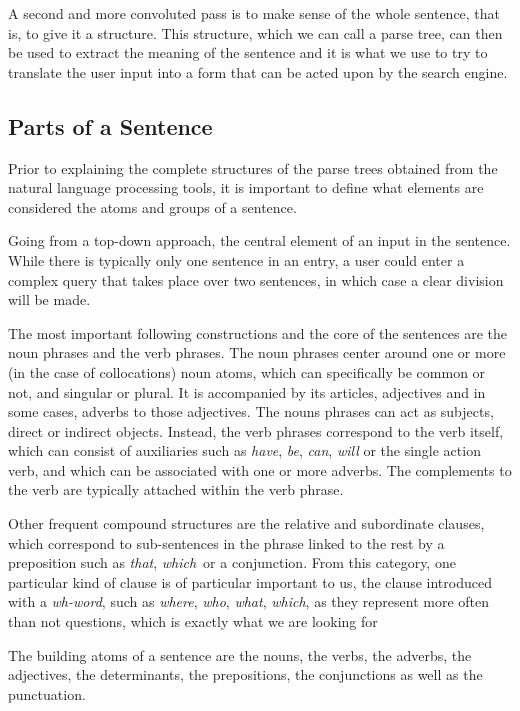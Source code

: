A second and more convoluted pass is to make sense of the whole sentence, that is, to give it a structure. This structure, which we can call a parse tree, can then be used to extract the meaning of the sentence and it is what we use to try to translate the user input into a form that can be acted upon by the search engine.


\subsection{Parts of a Sentence} %
\label{sub:parts_of_a_sentence}

Prior to explaining the complete structures of the parse trees obtained from the natural language processing tools, it is important to define what elements are considered the atoms and groups of a sentence.

Going from a top-down approach, the central element of an input in the sentence. While there is typically only one sentence in an entry, a user could enter a complex query that takes place over two sentences, in which case a clear division will be made.

The most important following constructions and the core of the sentences are the noun phrases and the verb phrases. The noun phrases center around one or more (in the case of collocations) noun atoms, which can specifically be common or not, and singular or plural. It is accompanied by its articles, adjectives and in some cases, adverbs to those adjectives. The nouns phrases can act as subjects, direct or indirect objects. Instead, the verb phrases correspond to the verb itself, which can consist of auxiliaries such as \emph{have}, \emph{be}, \emph{can}, \emph{will} or the single action verb, and which can be associated with one or more adverbs. The complements to the verb are typically attached within the verb phrase.

Other frequent compound structures are the relative and subordinate clauses, which correspond to sub-sentences in the phrase linked to the rest by a preposition such as \emph{that}, \emph{which}\ or a conjunction. From this category, one particular kind of clause is of particular important to us, the clause introduced with a \emph{wh-word}, such as \emph{where}, \emph{who}, \emph{what}, \emph{which}, as they represent more often than not questions, which is exactly what we are looking for

The building atoms of a sentence are the nouns, the verbs, the adverbs, the adjectives, the determinants, the prepositions, the conjunctions as well as the punctuation.

